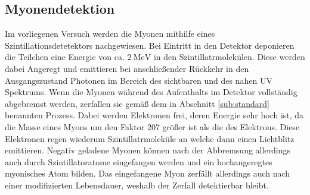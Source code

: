 \subsection{Myonendetektion}
Im vorliegenen Versuch werden die Myonen mithilfe eines Szintillationsdetetektors nachgewiesen. Bei Eintritt in den Detektor deponieren die Teilchen eine
Energie von ca. $\SI{2}{\mega\electronvolt}$ in den Szintillatrmolekülen. Diese werden dabei Angeregt und emittieren bei anschließender Rückkehr in den Ausgangszustand
Photonen im Bereich des sichtbaren und des nahen UV Spektrums. Wenn die Myonen während des Aufenthalts im Detektor vollständig abgebremst werden, zerfallen sie
gemäß dem in Abschnitt \ref{sub:standard} benannten Prozess. Dabei werden Elektronen frei, deren Energie sehr hoch ist, da die Masse eines Myons um den Faktor 207
größer ist als die des Elektrons. Diese Elektronen regen wiederum Szintillatrmoleküle an welche dann einen Lichtblitz emittieren.
Negativ geladene Myonen können nach der Abbremsung allerdings auch durch Szintillatoratome eingefangen werden und ein hochangeregtes myonisches Atom bilden.
Das eingefangene Myon zerfällt allerdings auch nach einer modifizierten Lebensdauer, weshalb der Zerfall detektierbar bleibt.
